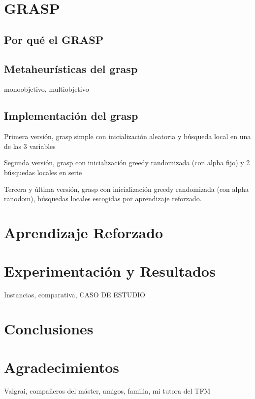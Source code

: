\documentclass[12pt,a4paper]{book}
\begin{document}
\chapter{GRASP}
\section{Por qué el GRASP}

\section{Metaheurísticas del grasp}
monoobjetivo, multiobjetivo

\section{Implementación del grasp}
Primera versión, grasp simple con inicialización aleatoria y búsqueda local en una de las 3 variables

Segunda versión, grasp con inicialización greedy randomizada (con alpha fijo) y 2 búsquedas locales en serie

Tercera y última versión, grasp con inicialización greedy randomizada (con alpha ranodom), búsquedas locales escogidas por aprendizaje reforzado.

\chapter{Aprendizaje Reforzado}

\chapter{Experimentación y Resultados}

Instancias, comparativa, CASO DE ESTUDIO

\chapter{Conclusiones}

\chapter{Agradecimientos}
Valgrai, compañeros del máster, amigos, familia, mi tutora del TFM
\end{document}
